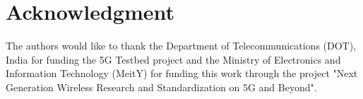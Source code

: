 \documentclass[journal]{IEEEtran}
\begin{document}
\section*{Acknowledgment}
The authors would like to thank the Department of Telecommunications (DOT), India for funding the 5G Testbed project and the Ministry of Electronics and Information Technology (MeitY) for funding this work through the project "Next Generation Wireless Research and Standardization on 5G and Beyond".





\newpage








\vfill\pagebreak
\end{document}
